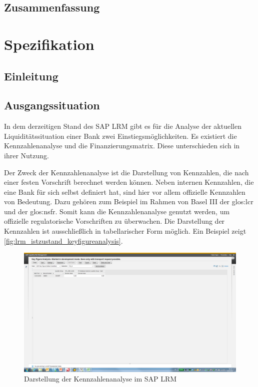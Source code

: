 \begin{onehalfspacing}
\section{Zusammenfassung}
\loreIpsum

\chapter{Spezifikation} 
\section{Einleitung}
\loreIpsum
\section{Ausgangssituation}

In dem derzeitigen Stand des SAP LRM gibt es für die Analyse der aktuellen Liquiditätssituation einer Bank zwei Einstiegsmöglichkeiten. Es existiert die Kennzahlenanalyse und die Finanzierungsmatrix. Diese unterschieden sich in ihrer Nutzung.

Der Zweck der Kennzahlenanalyse ist die Darstellung von Kennzahlen, die nach einer festen Vorschrift berechnet werden können. Neben internen Kennzahlen, die eine Bank für sich selbst definiert hat, sind hier vor allem offizielle Kennzahlen von Bedeutung. Dazu gehören zum Beispiel im Rahmen von Basel III der \gls{glos:lcr} und der \gls{glos:nsfr}. Somit kann die Kennzahlenanalyse genutzt werden, um offizielle regulatorische Vorschriften zu überwachen. Die Darstellung der Kennzahlen ist ausschließlich in tabellarischer Form möglich. Ein Beispiel zeigt \vref{fig:lrm_istzustand_keyfigureanalysis}.

\begin{figure}[h]
\centering
\setlength{\unitlength}{1mm}
\includegraphics[width=15cm]{images/KeyFigureAnalysis_Example.png}
\caption{Darstellung der Kennzahlenanalyse im SAP LRM\label{fig:lrm_istzustand_keyfigureanalysis}}
\end{figure} 


\end{onehalfspacing}
